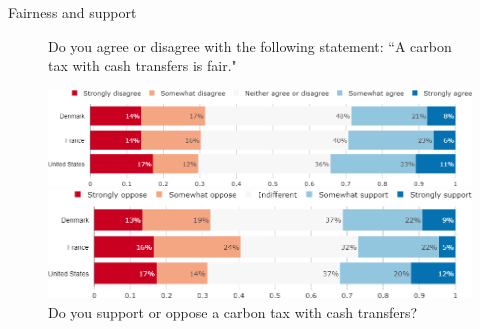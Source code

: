 \documentclass[aspectratio=169,9pt,dvipsnames]{beamer}
\begin{document}
\begin{frame}{Fairness and support}%
\begin{figure}[h!]
\centering
\caption{Do you agree or disagree with the following statement: ``A carbon tax with cash transfers is fair."}
\includegraphics[width=.7\textwidth]{../figures/country_comparison/tax_transfers_fair_countries.png}
\vspace{.5cm}
\centering
\caption{Do you support or oppose a carbon tax with cash transfers?}
\includegraphics[width=.7\textwidth]{../figures/country_comparison/tax_transfers_support_countries.png}
\end{figure}

\end{frame}


\end{document}
